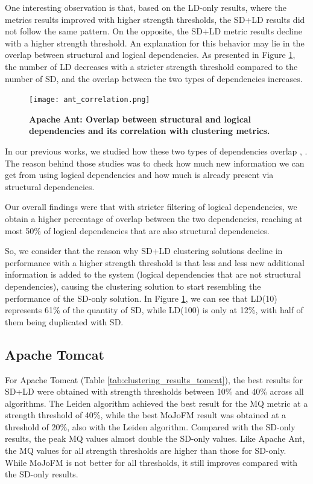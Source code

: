 \documentclass{ieeeaccess}
\begin{document}
One interesting observation is that, based on the LD-only results, where the metrics results improved with higher strength thresholds, the SD+LD results did not follow the same pattern. On the opposite, the SD+LD metric results decline with a higher strength threshold. An explanation for this behavior may lie in the overlap between structural and logical dependencies. As presented in Figure \ref{fig:ant_correlation}, the number of LD decreases with a stricter strength threshold compared to the number of SD, and the overlap between the two types of dependencies increases.

\begin{figure}[t!]
\centering
\texttt{[image: ant\_correlation.png]}
\caption{\textbf{Apache Ant: Overlap between structural and logical dependencies and its correlation with clustering metrics.}}
\label{fig:ant_correlation}
\end{figure}

In our previous works, we studied how these two types of dependencies overlap \cite{b4}, \cite{b5}. The reason behind those studies was to check how much new information we can get from using logical dependencies and how much is already present via structural dependencies.

Our overall findings were that with stricter filtering of logical dependencies, we obtain a higher percentage of overlap between the two dependencies, reaching at most 50\% of logical dependencies that are also structural dependencies.

So, we consider that the reason why SD+LD clustering solutions decline in performance with a higher strength threshold is that less and less new additional information is added to the system (logical dependencies that are not structural dependencies), causing the clustering solution to start resembling the performance of the SD-only solution. In Figure \ref{fig:ant_correlation}, we can see that LD(10) represents 61\% of the quantity of SD, while LD(100) is only at 12\%, with half of them being duplicated with SD.

\subsection{Apache Tomcat}

For Apache Tomcat (Table \ref{tab:clustering_results_tomcat}), the best results for SD+LD were obtained with strength thresholds between 10\% and 40\% across all algorithms. The Leiden algorithm achieved the best result for the MQ metric at a strength threshold of 40\%, while the best MoJoFM result was obtained at a threshold of 20\%, also with the Leiden algorithm. Compared with the SD-only results, the peak MQ values almost double the SD-only values. Like Apache Ant, the MQ values for all strength thresholds are higher than those for SD-only. While MoJoFM is not better for all thresholds, it still improves compared with the SD-only results.
\end{document}
